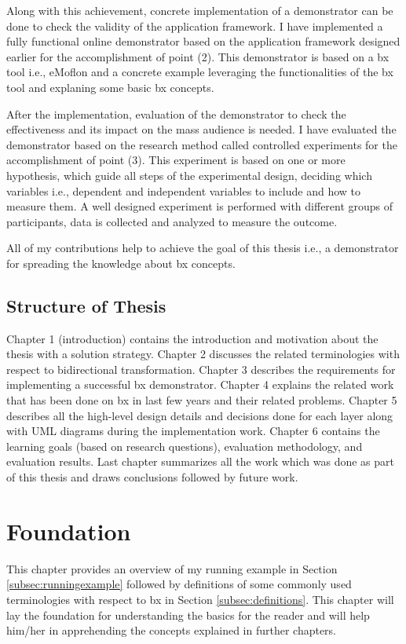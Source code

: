 Along with this achievement, concrete implementation of a demonstrator can be done to check the validity of the application framework. I have implemented a fully functional online demonstrator based on the application framework designed earlier for the accomplishment of point (2). This demonstrator is based on a bx tool i.e., eMoflon and a concrete example leveraging the functionalities of the bx tool and explaning some basic bx concepts. 

After the implementation, evaluation of the demonstrator to check the effectiveness and its impact on the mass audience is needed. I have evaluated the demonstrator based on the research method called controlled experiments \cite{semethods} for the accomplishment of point (3). This experiment is based on one or more hypothesis, which guide all steps of the experimental design, deciding which variables i.e., dependent and independent variables to include and how to measure them. A well designed experiment is performed with different groups of participants, data is collected and analyzed to measure the outcome.

All of my contributions help to achieve the goal of this thesis i.e., a demonstrator for spreading the knowledge about bx concepts.

\subsection{Structure of Thesis}\label{subsec:structure}

Chapter 1 (introduction) contains the introduction and motivation about the thesis with a solution strategy. Chapter 2 discusses the related terminologies with respect to bidirectional transformation. Chapter 3 describes the requirements for implementing a successful bx demonstrator. Chapter 4 explains the related work that has been done on bx in last few years and their related problems. Chapter 5 describes all the high-level design details and decisions done for each layer along with UML diagrams during the implementation work. Chapter 6 contains the learning goals (based on research questions), evaluation methodology, and evaluation results. Last chapter summarizes all the work which was done as part of this thesis and draws conclusions followed by future work.

\clearpage
\section{Foundation}\label{sec:foundation}
This chapter provides an overview of my running example in Section \ref{subsec:runningexample} followed by definitions of some commonly used terminologies with respect to bx in Section \ref{subsec:definitions}. This chapter will lay the foundation for understanding the basics for the reader and will help him/her in apprehending the concepts explained in further chapters.

